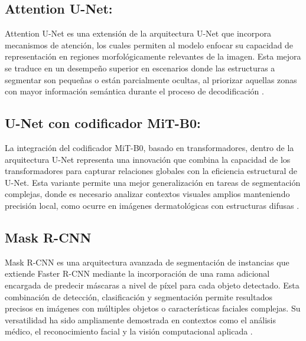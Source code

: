 \subsection{Attention U-Net:} 
Attention U-Net es una extensión de la arquitectura U-Net que incorpora mecanismos de atención, los cuales permiten al modelo enfocar su capacidad de representación en regiones morfológicamente relevantes de la imagen. Esta mejora se traduce en un desempeño superior en escenarios donde las estructuras a segmentar son pequeñas o están parcialmente ocultas, al priorizar aquellas zonas con mayor información semántica durante el proceso de decodificación \parencite{oktay2018attentionunet}.

\subsection{U-Net con codificador MiT-B0:} 
La integración del codificador MiT-B0, basado en transformadores, dentro de la arquitectura U-Net representa una innovación que combina la capacidad de los transformadores para capturar relaciones globales con la eficiencia estructural de U-Net. Esta variante permite una mejor generalización en tareas de segmentación complejas, donde es necesario analizar contextos visuales amplios manteniendo precisión local, como ocurre en imágenes dermatológicas con estructuras difusas \parencite{Yeom2025}.

\subsection{Mask R-CNN} 
Mask R-CNN es una arquitectura avanzada de segmentación de instancias que extiende Faster R-CNN mediante la incorporación de una rama adicional encargada de predecir máscaras a nivel de píxel para cada objeto detectado. Esta combinación de detección, clasificación y segmentación permite resultados precisos en imágenes con múltiples objetos o características faciales complejas. Su versatilidad ha sido ampliamente demostrada en contextos como el análisis médico, el reconocimiento facial y la visión computacional aplicada \parencite{Jung2019AutomaticNucleiSegmentation}.

